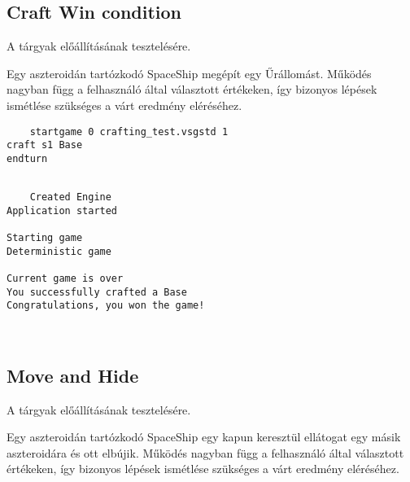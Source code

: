 \documentclass[../../projlab]{subfiles}
\begin{document}
\subsection{Craft Win condition}
\begin{test-case-description}
    A tárgyak előállításának tesztelésére.
\end{test-case-description}
\begin{test-case-function}
    Egy aszteroidán tartózkodó SpaceShip megépít egy Űrállomást. \newline
    Működés nagyban függ a felhasználó által választott értékeken, így bizonyos lépések ismétlése szükséges a várt eredmény eléréséhez.
\end{test-case-function}
\begin{test-case-input}
   
    \begin{verbatim}
    startgame 0 crafting_test.vsgstd 1
craft s1 Base
endturn
    \end{verbatim}
\end{test-case-input}
\begin{test-case-output}
\begin{verbatim}
    
    Created Engine
Application started

Starting game
Deterministic game

Current game is over
You successfully crafted a Base
Congratulations, you won the game!

    
\end{verbatim}
\end{test-case-output}

\subsection{Move and Hide}
\begin{test-case-description}
    A tárgyak előállításának tesztelésére.
\end{test-case-description}
\begin{test-case-function}
    Egy aszteroidán tartózkodó SpaceShip egy kapun keresztül ellátogat egy másik aszteroidára és ott elbújik. \newline
    Működés nagyban függ a felhasználó által választott értékeken, így bizonyos lépések ismétlése szükséges a várt eredmény eléréséhez.
\end{test-case-function}
\begin{test-case-input}

    
    \begin{verbatim}
    
    \end{verbatim}
\end{test-case-input}
\begin{test-case-output}

\end{test-case-output}
\end{document}
